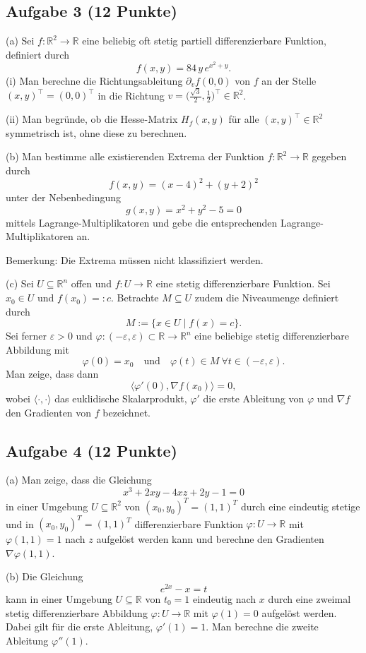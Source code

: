 \begin{enumerate}
\newpage
\subsection*{Aufgabe 3 (12 Punkte)}
(a) Sei $f:\mathbb{R}^2\to\mathbb{R}$ eine beliebig oft stetig partiell differenzierbare Funktion, definiert durch
\[
f(x,y)=84\,y\,e^{x^2+y}.
\]
(i) Man berechne die Richtungsableitung $\partial_v f(0,0)$ von $f$ an der Stelle $(x,y)^\top=(0,0)^\top$ in die Richtung $v=\bigl(\tfrac{\sqrt{3}}{2},\tfrac{1}{2}\bigr)^\top\in\mathbb{R}^2$.

(ii) Man begründe, ob die Hesse-Matrix $H_f(x,y)$ für alle $(x,y)^\top\in\mathbb{R}^2$ symmetrisch ist, ohne diese zu berechnen.

(b) Man bestimme alle existierenden Extrema der Funktion $f:\mathbb{R}^2\to\mathbb{R}$ gegeben durch
\[
f(x,y)=(x-4)^2+(y+2)^2
\]
unter der Nebenbedingung
\[
g(x,y)=x^2+y^2-5=0
\]
mittels Lagrange-Multiplikatoren und gebe die entsprechenden Lagrange-Multiplikatoren an.

Bemerkung: Die Extrema müssen nicht klassifiziert werden.

(c) Sei $U\subseteq\mathbb{R}^n$ offen und $f:U\to\mathbb{R}$ eine stetig differenzierbare Funktion. Sei $x_0\in U$ und $f(x_0)=:c$. Betrachte $M\subseteq U$ zudem die Niveaumenge definiert durch
\[
M:=\{x\in U\mid f(x)=c\}.
\]
Sei ferner $\varepsilon>0$ und $\varphi:(-\varepsilon,\varepsilon) \subset \mathbb{R} \to\mathbb{R}^n$ eine beliebige stetig differenzierbare Abbildung mit
\[
\varphi(0)=x_0\quad\text{und}\quad \varphi(t)\in M\ \forall t\in(-\varepsilon,\varepsilon).
\]
Man zeige, dass dann
\[
\langle\varphi'(0),\nabla f(x_0)\rangle=0,
\]
wobei $\langle\cdot,\cdot\rangle$ das euklidische Skalarprodukt, $\varphi'$ die erste Ableitung von $\varphi$ und $\nabla f$ den Gradienten von $f$ bezeichnet.

\newpage
\subsection*{Aufgabe 4 (12 Punkte)}
(a) Man zeige, dass die Gleichung
\[
 x^{3}+2xy-4xz+2y-1=0
\]
in einer Umgebung \(U\subseteq\mathbb{R}^{2}\) von \((x_{0},y_{0})^{T}=(1,1)^{T}\) durch eine eindeutig stetige und in \((x_{0},y_{0})^{T}=(1,1)^{T}\) differenzierbare Funktion \(\varphi:U\to\mathbb{R}\) mit \(\varphi(1,1)=1\) nach \(z\) aufgelöst werden kann und berechne den Gradienten \(\nabla\varphi(1,1)\).

(b) Die Gleichung
\[
 e^{2x}-x=t
\]
kann in einer Umgebung \(U\subseteq\mathbb{R}\) von \(t_{0}=1\) eindeutig nach \(x\) durch eine zweimal stetig differenzierbare Abbildung \(\varphi:U\to\mathbb{R}\) mit \(\varphi(1)=0\) aufgelöst werden. Dabei gilt für die erste Ableitung, \(\varphi'(1)=1\). Man berechne die zweite Ableitung \(\varphi''(1)\).


\end{enumerate}
